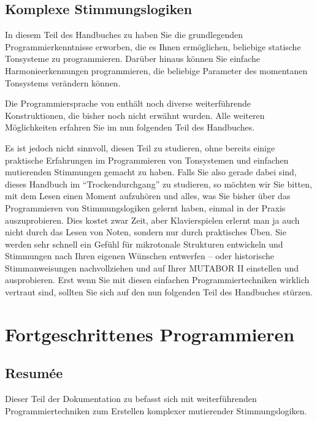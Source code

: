 \chapter{Komplexe Stimmungslogiken}\label{cha:kompl-stimm}

In diesem Teil des Handbuches zu \mutabor{} haben Sie die
grundlegenden Programmierkenntnisse erworben, die es Ihnen
ermöglichen, beliebige statische Tonsysteme zu programmieren. Darüber
hinaus können Sie einfache Harmonieerkennungen programmieren, die
beliebige Parameter des momentanen Tonsystems verändern können.

Die Programmiersprache von \mutabor{} enthält noch
diverse wei\-ter\-füh\-ren\-de Konstruktionen, die bisher noch nicht
erwähnt wurden. Alle weiteren Möglichkeiten
erfahren Sie im nun folgenden Teil des Handbuches.

Es ist jedoch nicht sinnvoll, diesen Teil zu studieren, ohne bereits
einige praktische Erfahrungen im Programmieren von Tonsystemen und
einfachen mutierenden Stimmungen gemacht zu haben. Falls Sie also
gerade dabei sind, dieses Handbuch im "`Trockendurchgang"' zu
studieren, so möchten wir Sie bitten, mit dem Lesen einen Moment
aufzuhören und alles, was Sie bisher über das Programmieren von
Stimmungslogiken gelernt haben, einmal in der Praxis auszuprobieren.
Dies kostet zwar Zeit, aber Klavierspielen erlernt man ja auch nicht
durch das Lesen von Noten, sondern nur durch praktisches Üben. Sie
werden sehr schnell ein Gefühl für mikrotonale Strukturen entwickeln
und Stimmungen nach Ihren eigenen Wünschen entwerfen -- oder
historische Stimmanweisungen nachvollziehen und auf Ihrer MUTABOR II
einstellen und ausprobieren. Erst wenn Sie mit diesen einfachen
Programmiertechniken wirklich vertraut sind, sollten Sie sich auf den
nun folgenden Teil des Handbuches stürzen.


%
%


\part{Fortgeschrittenes Programmieren}\label{part:fortg-progr}
\label{teilFortgesch}

\chapter{Resum\'{e}e}\label{cha:resumee}
Dieser Teil der Dokumentation zu \mutabor{} befasst sich mit
weiterführenden Programmiertechniken zum Erstellen komplexer
mutierender Stimmungslogiken.

